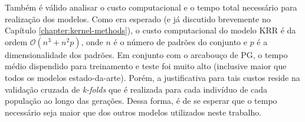 Também é válido analisar o custo computacional e o tempo total necessário para realização dos modelos. Como era esperado (e já discutido brevemente no Capítulo \ref{chapter:kernel-methods}), o custo computacional do modelo KRR é da ordem $\mathcal{O}(n^3 + n^2p)$, onde $n$ é o número de padrões do conjunto e $p$ é a dimensionalidade dos padrões. Em conjunto com o arcabouço de PG, o tempo médio dispendido para treinamento e teste foi muito alto (inclusive maior que todos os modelos estado-da-arte). Porém, a justificativa para tais custos reside na validação cruzada de \textit{k-folds} que é realizada para cada indivíduo de cada população ao longo das gerações. Dessa forma, é de se esperar que o tempo necessário seja maior que dos outros modelos utilizados neste trabalho.


